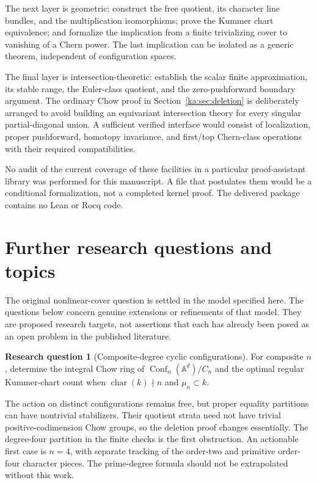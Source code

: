 \documentclass[11pt,a4paper]{article}
\theoremstyle{definition}
\newtheorem{question}[theorem]{Research question}
\theoremstyle{remark}
\newcommand{\charac}{\operatorname{char}}
\newcommand{\A}{\mathbb A}
\newcommand{\Conf}{\operatorname{Conf}}
\begin{document}
The next layer is geometric: construct the free quotient, its character
line bundles, and the multiplication isomorphisms; prove the Kummer
chart equivalence; and formalize the implication from a finite
trivializing cover to vanishing of a Chern power. The last implication
can be isolated as a generic theorem, independent of configuration
spaces.

The final layer is intersection-theoretic: establish the scalar finite
approximation, its stable range, the Euler-class quotient, and the
zero-pushforward boundary argument. The ordinary Chow proof in
Section~\ref{ka:sec:deletion} is deliberately arranged to avoid building
an equivariant intersection theory for every singular partial-diagonal
union. A sufficient verified interface would consist of localization,
proper pushforward, homotopy invariance, and first/top Chern-class
operations with their required compatibilities.

No audit of the current coverage of these facilities in a particular
proof-assistant library was performed for this manuscript. A file that
postulates them would be a conditional formalization, not a completed
kernel proof. The delivered package contains no Lean or Rocq code.

\section{Further research questions and topics}
\label{ka:sec:questions}

The original nonlinear-cover question is settled in the model specified
here. The questions below concern genuine extensions or refinements of
that model. They are proposed research targets, not assertions that each
has already been posed as an open problem in the published literature.

\begin{question}[Composite-degree cyclic configurations]
For composite $n$, determine the integral Chow ring of
$\Conf_n(\A^d)/C_n$ and the optimal regular Kummer-chart count when
$\charac(k)\nmid n$ and $\mu_n\subset k$.
\end{question}
The action on distinct configurations remains free, but proper equality
partitions can have nontrivial stabilizers. Their quotient strata need
not have trivial positive-codimension Chow groups, so the deletion proof
changes essentially. The degree-four partition in the finite checks is
the first obstruction. An actionable first case is $n=4$, with separate
tracking of the order-two and primitive order-four character pieces.
The prime-degree formula should not be extrapolated without this work.
\end{document}
